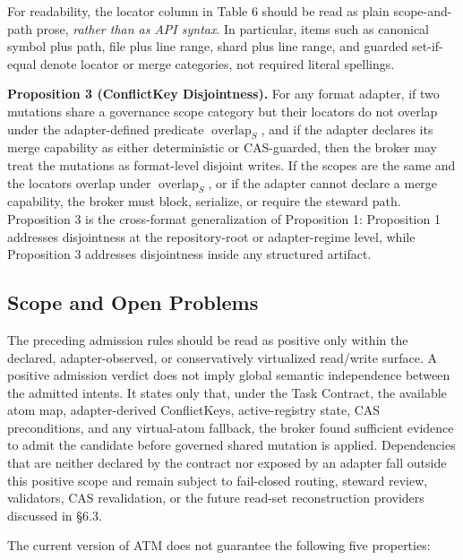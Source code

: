 \documentclass[9pt,letterpaper]{extarticle}
\begin{document}
For readability, the locator column in Table 6 should be read as plain scope-and-path prose, \emph{rather than as API syntax}. In particular, items such as canonical symbol plus path, file plus line range, shard plus line range, and guarded set-if-equal denote locator or merge categories, not required literal spellings.

\textbf{Proposition 3 (ConflictKey Disjointness).} For any format adapter, if two mutations share a governance scope category but their locators do not overlap under the adapter-defined predicate $\operatorname{overlap}_{S}$, and if the adapter declares its merge capability as either deterministic or CAS-guarded, then the broker may treat the mutations as format-level disjoint writes. If the scopes are the same and the locators overlap under $\operatorname{overlap}_{S}$, or if the adapter cannot declare a merge capability, the broker must block, serialize, or require the steward path. Proposition 3 is the cross-format generalization of Proposition 1: Proposition 1 addresses disjointness at the repository-root or adapter-regime level, while Proposition 3 addresses disjointness inside any structured artifact.

\subsection{Scope and Open Problems}

The preceding admission rules should be read as positive only within the declared, adapter-observed, or conservatively virtualized read/write surface. A positive admission verdict does not imply global semantic independence between the admitted intents. It states only that, under the Task Contract, the available atom map, adapter-derived ConflictKeys, active-registry state, CAS preconditions, and any virtual-atom fallback, the broker found sufficient evidence to admit the candidate before governed shared mutation is applied. Dependencies that are neither declared by the contract nor exposed by an adapter fall outside this positive scope and remain subject to fail-closed routing, steward review, validators, CAS revalidation, or the future read-set reconstruction providers discussed in §6.3.

The current version of ATM does not guarantee the following five properties:
\end{document}

